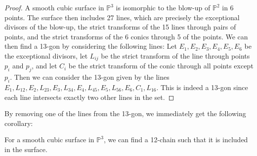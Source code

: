 \begin{proof}
    A smooth cubic surface in $\mathbb{P}^3$ is isomorphic to the blow-up of $\mathbb{P}^2$ in 6 points. The surface then includes 27 lines, which are precisely the exceptional divisors of the blow-up, the strict transforms of the 15 lines through pairs of points, and the strict transforms of the 6 conics through 5 of the points. We can then find a 13-gon by considering the following lines: Let $E_1, E_2, E_3, E_4, E_5, E_6$ be the exceptional divisors, let $L_{ij}$ be the strict transform of the line through points $p_i$ and $p_j$, and let $C_i$ be the strict transform of the conic through all points except $p_i$. Then we can consider the 13-gon given by the lines $E_1, L_{12}, E_2, L_{23}, E_3, L_{34}, E_4, L_{45}, E_5, L_{56}, E_6, C_1, L_{16}$. This is indeed a 13-gon since each line intersects exactly two other lines in the set.
\end{proof}

By removing one of the lines from the 13-gon, we immediately get the following corollary:
\begin{corollary}
    For a smooth cubic surface in $\mathbb{P}^3$, we can find a 12-chain such that it is included in the surface.
\end{corollary}